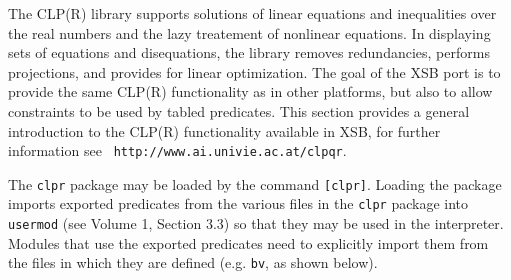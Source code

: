 The CLP(R) library supports solutions of linear equations and
inequalities over the real numbers and the lazy treatement of
nonlinear equations.  In displaying sets of equations and
disequations, the library removes redundancies, performs projections,
and provides for linear optimization.  The goal of the XSB port is to
provide the same CLP(R) functionality as in other platforms, but also
to allow constraints to be used by tabled predicates.  This section
provides a general introduction to the CLP(R) functionality available
in XSB, for further information see {\tt
http://www.ai.univie.ac.at/clpqr}.

The {\tt clpr} package may be loaded by the command {\tt [clpr]}.
Loading the package imports exported predicates from the various files
in the {\tt clpr} package into {\tt usermod} (see Volume 1, Section
3.3) so that they may be used in the interpreter.  Modules that use
the exported predicates need to explicitly import them from the files
in which they are defined (e.g. {\tt bv}, as shown below).

